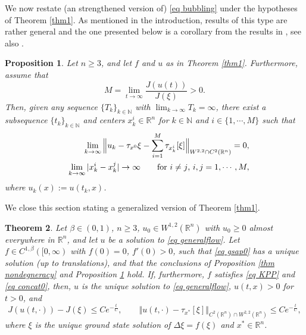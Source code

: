 \documentclass[11pt,letterpaper,reqno]{amsart}
\newcommand{\N}{\mathbb{N}}
\newcommand{\R}{\mathbb{R}}
\theoremstyle{plain}%
\newtheorem{theorem}{Theorem}[section]
\newtheorem{proposition}[theorem]{Proposition}
\theoremstyle{definition}
\numberwithin{equation}{section}
\numberwithin{figure}{section}
\begin{document}
We now restate (an strengthened version of) \eqref{eq bubbling} under the hypotheses of Theorem \ref{thm1}. As mentioned in the introduction, results of this type are rather general and the one presented below is a corollary from the results in \cite{lions1988positive}, see also \cite[Lemma 3.3]{feireisl1997threshold}.

\begin{proposition}\label{eq Jbubbling}
Let $n\geq 3$, and let $f$ and $u$ as in Theorem \ref{thm1}. Furthermore, assume that
\begin{equation}\label{eq limbubbles}
   M =  \lim_{t \to \infty} \frac{J(u(t))}{J(\xi)} >0.
\end{equation}
Then, given any sequence $\{T_k\}_{k\in \N}$ with $\lim_{k \to \infty} T_k =\infty$, there exist a subsequence $\{t_k\}_{k\in \N}$ and centers $x_k^i \in \R^n$ for $k\in \N$ and $i \in \{1,\cdots, M\}$ such that 
    \begin{eqnarray}\notag
   &&\lim_{k\to \infty} \Big\Vert u_k -\tau_{x^0}\xi -\sum_{i=1}^M \tau_{x_k^i}[\xi] \Big \Vert_{W^{2,2}\cap C^2(\R^n)} =0,\\ \label{eq bubbling1}
   &&\lim_{k\to \infty} |x^i_k -x^j_k| \to \infty \qquad \mbox{for $i\neq j$, $i,j =1, \cdots, M,$}
\end{eqnarray}
where $u_k(x):= u(t_k, x)$.
\end{proposition}

We close this section stating a generalized version of Theorem \ref{thm1}.

\begin{theorem}\label{thm gen}
    Let $\beta \in (0,1)$, $n\geq 3$, $u_0 \in W^{1,2}(\R^n)$ with $u_0 \geq 0$ almost everywhere in $\R^n$, and let $u$ be a solution to \eqref{eq generalflow}. Let $f \in C^{1,\beta}([0, \infty)$ with $f(0)=0$, $f'(0)>0$, such that \eqref{eq gsap0} has a unique solution (up to translations), and that the conclusions of Proposition \ref{thm nondegneracy} and Proposition \ref{eq Jbubbling} hold. If, furthermore, $f$ satisfies \eqref{eq KPP}  and \eqref{eq concat0}, then, $u$ is the unique solution to \eqref{eq generalflow}, $u(t,x)>0$ for $t>0$, and 
\begin{equation}\label{eq nonzerogen}
   J(u(t, \cdot))-J(\xi) \leq C e^{-\frac{t}{C}}, \qquad \Vert u(t, \cdot)-\tau_{x^*}[\xi]\Vert_{C^2(\R^n)\cap W^{2,2}(\R^n)} \leq C e^{-\frac{t}{C}},
\end{equation}
where $\xi$ is the unique ground state solution of $\Delta \xi=f(\xi)$ and $x^* \in \R^n$.
\end{theorem} 
\end{document}
